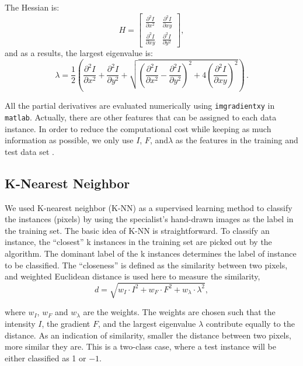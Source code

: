 \documentclass[12pt, notitlepage]{article}
\begin{document}
The Hessian is:
\begin{equation}
H =
\begin{bmatrix}
  \frac{\partial^2I}{\partial x^2}   & \frac{\partial^2I}{\partial xy} \\
\frac{\partial^2I}{\partial xy}  &\frac{\partial^2I}{\partial y^2} 
\end{bmatrix} ,
\end{equation}
and as a results, the largest eigenvalue is:
\begin{equation}
\lambda = \frac{1}{2} \left( \frac{\partial^2I}{\partial x^2} +\frac{\partial^2I}{\partial y^2} + \sqrt{\left(\frac{\partial^2I}{\partial x^2} - \frac{\partial^2I}{\partial y^2} \right)^2 + 4 \left( \frac{\partial^2I}{\partial xy} \right)^2 } \right) \,.
\end{equation}

All the partial derivatives are evaluated numerically using \verb|imgradientxy| in \verb|matlab|. Actually, there are other features that can be assigned to each data instance.  In order to reduce the computational cost while keeping as much information as possible, we only use $I$, $F$, and$\lambda$ as the features in the training and test data set \cite{alex2014machine}.

 
\subsection{K-Nearest Neighbor}

We used K-nearest neighbor (K-NN) as a supervised learning method to classify the instances (pixels) by using the specialist's hand-drawn images as the label in the training set. The basic idea of K-NN is straightforward. To classify an instance, the ``closest'' k instances in the training set are picked out by the algorithm.  The dominant label of the k instances determines the label of instance to be classified.  The ``closeness'' is defined as the similarity between two pixels, and weighted Euclidean distance is used here to measure the similarity,
\begin{equation}
d = \sqrt{ w_I\cdot I^2 + w_F\cdot F^2+w_\lambda \cdot \lambda^2} ,
\end{equation}

where $w_I$, $w_F$ and $w_\lambda$ are the weights. The weights are chosen such that the intensity $I$, the gradient $F$, and the largest eigenvalue $\lambda$ contribute equally to the distance. As an indication of similarity, smaller the distance between two pixels, more similar they are. This is a two-class case, where a test instance will be either classified as 1 or $-1$. 
\end{document}
